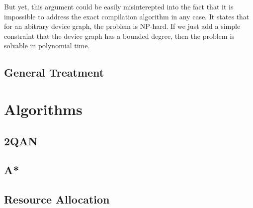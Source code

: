 \documentclass{article}
\begin{document}
  But yet, this argument could be easily misinterepted into the fact that it is impossible to address the exact compilation algorithm in any case. It states that for an abitrary device graph, the problem is NP-hard. If we just add a simple constraint that the device graph has a bounded degree, then the problem is solvable in polynomial time. \cite{?}

  \subsection{General Treatment}
  
  \section{Algorithms}
  \subsection{2QAN}
  \subsection{A*}
  \subsection{Resource Allocation}
  
\end{document}
